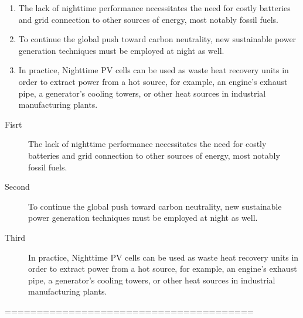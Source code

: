 \documentclass{article}
\begin{document}
	\begin{enumerate}
		\item The lack of nighttime performance necessitates the need for costly batteries and grid connection to other sources of energy, most notably fossil fuels.
		\item To continue the global push toward carbon neutrality, new sustainable power generation techniques must be employed at night as well.

		\item In practice, Nighttime PV cells can be used as waste heat recovery units in order to extract power from a hot source, for example, an engine’s exhaust pipe, a generator’s cooling towers, or other heat sources in industrial manufacturing plants.

	\end{enumerate}

	\begin{description}
		\item[Fisrt]  The lack of nighttime performance necessitates the need for costly batteries and grid connection to other sources of energy, most notably fossil fuels.
		\item[Second] To continue the global push toward carbon neutrality, new sustainable power generation techniques must be employed at night as well.
		\item[Third] In practice, Nighttime PV cells can be used as waste heat recovery units in order to extract power from a hot source, for example, an engine’s exhaust pipe, a generator’s cooling towers, or other heat sources in industrial manufacturing plants.
	\end{description}
	=======================================	
	
\end{document}
